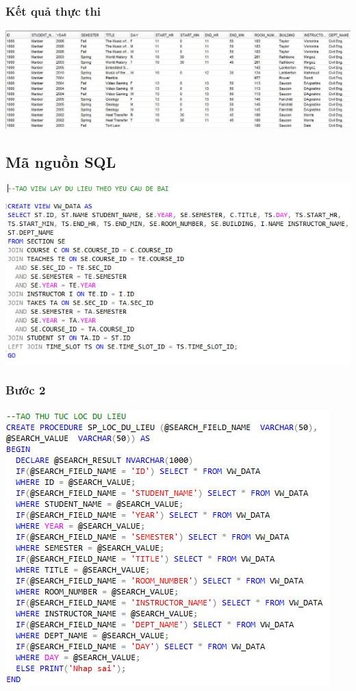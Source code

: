 \documentclass[12pt,a4paper]{report}
\begin{document}
\subsubsection{Kết quả thực thi}
\includegraphics[scale=.57]{kb2o.jpg}\\

\subsection{Mã nguồn SQL}
\includegraphics[scale=.9]{b2s1.jpg}
\subsubsection{Bước 2}
\includegraphics[scale=.9]{b2s2.jpg}
\end{document}
